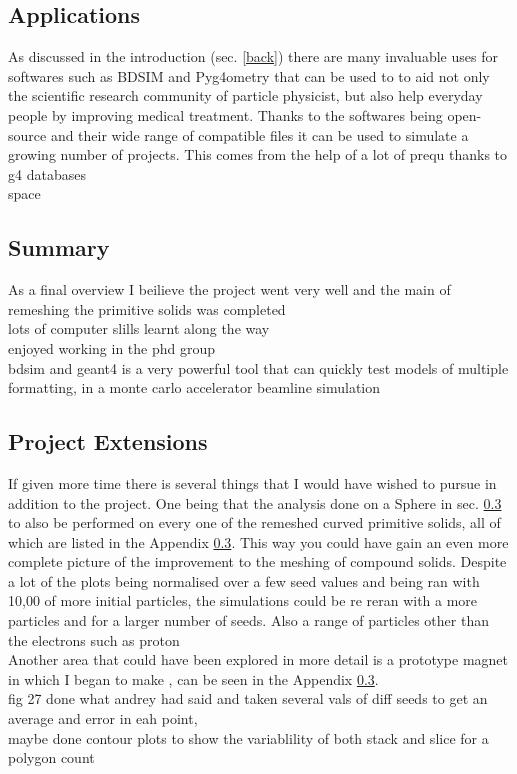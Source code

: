 \documentclass[12pt,a4paper]{article}
\begin{document}
\subsection{Applications}
As discussed in the introduction (sec. \ref{back}) there are many invaluable uses for softwares such as BDSIM and Pyg4ometry that can be used to to aid not only the scientific research community of particle physicist, but also help everyday people by improving medical treatment. Thanks to the softwares being open-source and their wide range of compatible files it can be used to simulate a growing number of projects. This comes from the help of a lot of prequ
thanks to g4 databases\\
space\\

\subsection{Summary}
As a final overview I beilieve the project went very well and the main of remeshing the primitive solids was completed\\
lots of computer slills learnt along the way\\
enjoyed working in the phd group\\
bdsim and geant4 is a very powerful tool that can quickly test models of multiple formatting, in a monte carlo accelerator beamline simulation


\subsection{Project Extensions}
If given more time there is several things that I  would have wished to pursue in addition to the project. One being that the analysis done on a Sphere in sec. \ref{} to also be performed on every one of the remeshed curved primitive solids, all of which are listed in the Appendix \ref{}. This way you could have gain an even more complete picture of the improvement to the meshing of compound solids. Despite a lot of the plots being normalised over a few seed values and being ran with 10,00 of more initial particles, the simulations could be re reran with a more particles and for a larger number of seeds. Also a range of particles other than the electrons such as proton\\
Another area that could have been explored in more detail is a prototype magnet in which I began to make , can be seen in the Appendix \ref{}.\\
fig 27 done what andrey had said and taken several vals of diff seeds to get an average and error in eah point, \\
maybe done contour plots to show the variablility of both stack and slice for a polygon count\\
\end{document}
